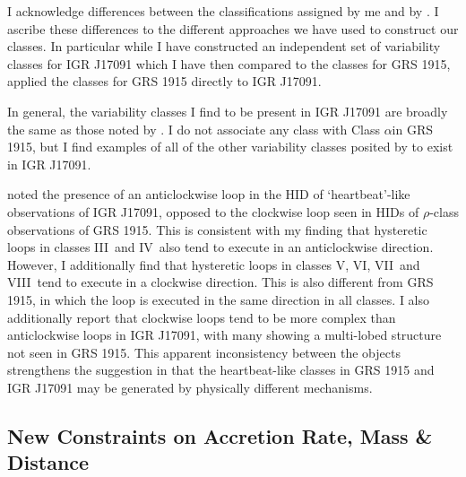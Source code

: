 \par I acknowledge differences between the classifications assigned by me and by \citet{Altamirano_IGR_FH}.  I ascribe these differences to the different approaches we have used to construct our classes.  In particular while I have constructed an independent set of variability classes for IGR J17091 which I have then compared to the \citeauthor{Belloni_GRS_MI} classes for GRS 1915, \citeauthor{Altamirano_IGR_FH} applied the \citeauthor{Belloni_GRS_MI} classes for GRS 1915 directly to IGR J17091.
\par In general, the variability classes I find to be present in IGR J17091 are broadly the same as those noted by \citet{Altamirano_IGR_FH}.  I do not associate any class with Class $\alpha$\indexalpha in GRS 1915, but I find examples of all of the other variability classes posited by \citeauthor{Altamirano_IGR_FH} to exist in IGR J17091.
\par \citealp{Altamirano_IGR_FH} noted the presence of an anticlockwise loop in the HID of `heartbeat'\indexrho-like observations of IGR J17091, opposed to the clockwise loop seen in HIDs of $\rho$-class observations of GRS 1915.  This is consistent with my finding that hysteretic loops in classes III\indexiii\ and IV\indexiv\ also tend to execute in an anticlockwise direction.  However, I additionally find that hysteretic loops in classes V\indexv, VI\indexvi, VII\indexvii\ and VIII\indexviii\ tend to execute in a clockwise direction.  This is also different from GRS 1915, in which the loop is executed in the same direction in all classes.  I also additionally report that clockwise loops tend to be more complex than anticlockwise loops in IGR J17091, with many showing a multi-lobed structure not seen in GRS 1915.  This apparent inconsistency between the objects strengthens the suggestion in \citealp{Altamirano_IGR_FH} that the heartbeat-like classes in GRS 1915 and IGR J17091 may be generated by physically different mechanisms.

\subsection{New Constraints on Accretion Rate, Mass \& Distance}
\label{sec:newmass}

